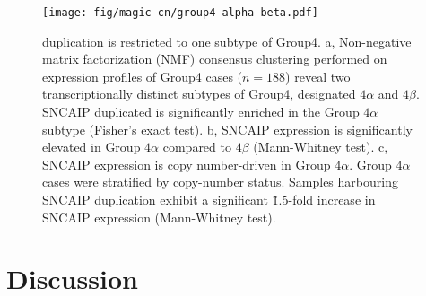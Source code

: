 \begin{figure}[b]
	\begin{center}
		\texttt{[image: fig/magic-cn/group4-alpha-beta.pdf]}
	\end{center}
	\caption[ duplication is restricted to one subtype of Group4]
	{
	 duplication is restricted to one subtype of Group4.
	\textsf{a}, Non-negative matrix factorization (NMF) consensus clustering performed on expression profiles of Group4 cases ($n = 188$) reveal two transcriptionally distinct subtypes of Group4, designated $4\alpha$ and $4\beta$. SNCAIP duplicated is significantly enriched in the Group $4\alpha$ subtype (Fisher's exact test).
	\textsf{b}, SNCAIP expression is significantly elevated in Group $4\alpha$ compared to $4\beta$ (Mann-Whitney test).
	\textsf{c}, SNCAIP expression is copy number-driven in Group $4\alpha$. Group $4\alpha$ cases were stratified by  copy-number status. Samples harbouring SNCAIP duplication exhibit a significant \~1.5-fold increase in SNCAIP expression (Mann-Whitney test).
	}
	\label{fig:group4-alpha-beta}
\end{figure}

\clearpage

\section{Discussion}

